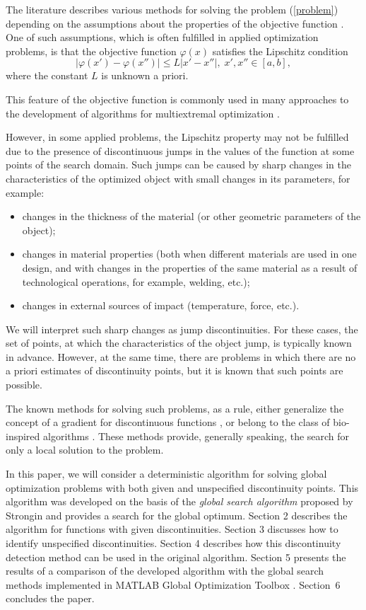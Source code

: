 \documentclass[runningheads]{llncs}
\begin{document}
The literature describes various methods for solving the problem (\ref{problem}) depending on the assumptions about the properties of the objective function \cite{Horst1995,Horst1996,Pinter1996}. One of such assumptions, which is often fulfilled in applied optimization problems, is that the objective function $\varphi(x)$ satisfies the Lipschitz condition 
\[
\left|\varphi(x')-\varphi(x'')\right|\leq L\left|x'-x''\right|,\; x',x'' \in [a,b],
\]
where the constant $L$ is unknown a priori. 

This feature of the objective function is commonly used in many approaches to the development of algorithms for multiextremal optimization \cite{Evtushenko2009,Evtushenko2013,Jones2009,Paulavicius2011}. 

However, in some applied problems, the Lipschitz property may not be fulfilled due to the presence of discontinuous jumps in the values of the function at some points of the search domain. Such jumps can be caused by sharp changes in the characteristics of the optimized object with small changes in its parameters, for example:
\begin{itemize}
  \item changes in the thickness of the material (or other geometric parameters of the object);
  \item changes in material properties (both when different materials are used in one design, and with changes in the properties of the same material as a result of technological operations, for example, welding, etc.);
  \item changes in external sources of impact (temperature, force, etc.).
\end{itemize}

We will interpret such sharp changes as jump discontinuities. For these cases, the set of points, at which the characteristics of the object jump, is typically known in advance. However, at the same time, there are problems in which there are no a priori estimates of discontinuity points, but it is known that such points are possible.

The known methods for solving such problems, as a rule, either generalize the concept of a gradient for discontinuous functions \cite{Batukhtin1993,Batukhtin1998,Moreau2000}, or belong to the class of bio-inspired algorithms \cite{Ban2019,ZhangXu}. These methods provide, generally speaking, the search for only a local solution to the problem.

In this paper, we will consider a deterministic algorithm for solving global optimization problems with both given and unspecified discontinuity points. This algorithm was developed on the basis of the \textit{global search algorithm} proposed by Strongin \cite{Strongin2000} and provides a search for the global optimum. Section 2 describes the algorithm for functions with given discontinuities. Section 3 discusses how to identify unspecified discontinuities. Section 4 describes how this discontinuity detection method can be used in the original algorithm. Section 5 presents the results of a comparison of the developed algorithm with the global search methods implemented in MATLAB Global Optimization Toolbox \cite{MatlabOTB}. Section~6 concludes the paper. 
\end{document}

